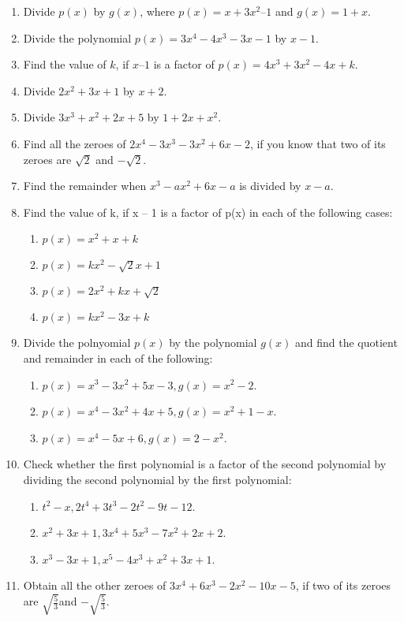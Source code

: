 \renewcommand{\theequation}{\theenumi}
\begin{enumerate}[label=\arabic*.,ref=\thesubsection.\theenumi]
%
\item Divide $p(x)$ by $g(x)$, where $p(x) = x + 3x^2– 1$ and $g(x) = 1 + x$.
\item Divide the polynomial $p(x) = 3x^4-4x^3-3x-1 $ by $x-1$.
\item Find the value of $k$, if $x – 1$ is a factor of $p(x) = 4x^3+ 3x^2 - 4x + k$.
%
\item Divide $2x^2+3x+1$ by $x+2$.
\item Divide $3x^3+x^2+2x+5$ by $1+2x+x^2$.
\item Find all the zeroes of $2x^4-3x^3-3x^2+6x-2$, if you know that two of its zeroes are $\sqrt{2}$ and $-\sqrt{2}$.
\item Find the remainder when $x^3-ax^2 +6x-a$ is divided by $x-a$.
\item Find the value of k, if x – 1 is a factor of p(x) in each of the following cases: 
\begin{enumerate}
\item $p(x) = x^2 + x + k$
\item $p(x) = kx^2-\sqrt{2}x+1$
\item $p(x) = 2x^2 + kx + \sqrt{2}$
\item $p(x) = kx^2  - 3x + k$
\end{enumerate}
\item Divide the polnyomial $p(x)$ by the polynomial $g(x)$ and find the quotient and remainder in each of the following:
\begin{enumerate}
\item $p(x) = x^3-3x^2+5x-3, g(x) = x^2-2$.
\item $p(x) = x^4-3x^2+4x+5, g(x) = x^2+1-x$.
\item $p(x) = x^4-5x+6, g(x) = 2-x^2$.
\end{enumerate}
\item Check whether the first polynomial is a factor of the second polynomial by dividing the second polynomial by the first polynomial:
\begin{enumerate}
\item $t^2-x,2t^4+3t^3-2t^2-9t-12$.
\item $x^2+3x+1, 3x^4+5x^3-7x^2+2x+2$.
\item $x^3-3x+1, x^5-4x^3+x^2+3x+1$.
\end{enumerate}
%
\item Obtain all the other zeroes of $3x^4+6x^3-2x^2-10x-5$, if two of its zeroes are $\sqrt{\frac{5}{3}}$and $-\sqrt{\frac{5}{3}}$.

\end{enumerate}
